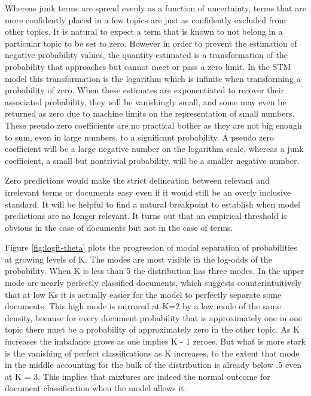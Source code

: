 \documentclass[]{book}
\theoremstyle{definition}
\theoremstyle{definition}
\theoremstyle{definition}
\theoremstyle{remark}
\begin{document}
Whereas junk terms are spread evenly as a function of uncertainty, terms
that are more confidently placed in a few topics are just as confidently
excluded from other topics. It is natural to expect a term that is known
to not belong in a particular topic to be set to zero. However in order
to prevent the estimation of negative probability values, the quantity
estimated is a transformation of the probability that approaches but
cannot meet or pass a zero limit. In the STM model this transformation
is the logarithm which is infinite when transforming a probability of
zero. When these estimates are exponentiated to recover their associated
probability, they will be vanishingly small, and some may even be
returned as zero due to machine limits on the representation of small
numbers. These pseudo zero coefficients are no practical bother as they
are not big enough to sum, even in large numbers, to a significant
probability. A pseudo zero coefficient will be a large negative number
on the logarithm scale, whereas a junk coefficient, a small but
nontrivial probability, will be a smaller negative number.

Zero predictions would make the strict delineation between relevant and
irrelevant terms or documents easy even if it would still be an overly
inclusive standard. It will be helpful to find a natural breakpoint to
establish when model predictions are no longer relevant. It turns out
that an empirical threshold is obvious in the case of documents but not
in the case of terms.

Figure \ref{fig:logit-theta} plots the progression of modal separation
of probabilities at growing levels of K. The modes are most visible in
the log-odds of the probability. When K is less than 5 the distribution
has three modes. In the upper mode are nearly perfectly classified
documents, which suggests counterintuitively that at low Ks it is
actually easier for the model to perfectly separate some documents. This
high mode is mirrored at K=2 by a low mode of the same density, because
for every document probability that is approximately one in one topic
there must be a probability of approximately zero in the other topic. As
K increases the imbalance grows as one implies K - 1 zeroes. But what is
more stark is the vanishing of perfect classifications as K increases,
to the extent that mode in the middle accounting for the bulk of the
distribution is already below .5 even at K = 3. This implies that
mixtures are indeed the normal outcome for document classification when
the model allows it.
\end{document}
